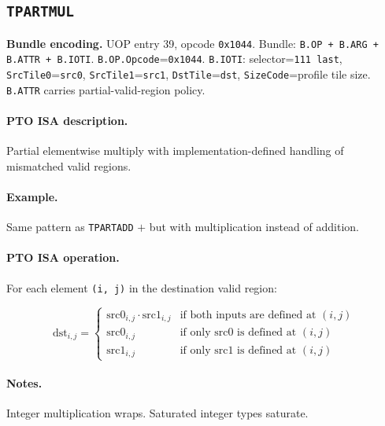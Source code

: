 \subsection{\texttt{TPARTMUL}}
\noindent\textbf{Bundle encoding.} UOP entry 39, opcode \texttt{0x1044}. Bundle: \texttt{B.OP + B.ARG + B.ATTR + B.IOTI}. \texttt{B.OP.Opcode}=\texttt{0x1044}. \texttt{B.IOTI}: selector=\texttt{111 last}, \texttt{SrcTile0}=\texttt{src0}, \texttt{SrcTile1}=\texttt{src1}, \texttt{DstTile}=\texttt{dst}, \texttt{SizeCode}=profile tile size. \texttt{B.ATTR} carries partial-valid-region policy.\par\smallskip
{\small
\paragraph{PTO ISA description.}
Partial elementwise multiply with implementation-defined handling of mismatched valid regions.
\paragraph{Example.}
Same pattern as \texttt{TPARTADD} $+$ but with multiplication instead of addition.
\par\smallskip
\paragraph{PTO ISA operation.}
For each element \texttt{(i, j)} in the destination valid region:

\[
\mathrm{dst}_{i,j} =
\begin{cases}
\mathrm{src0}_{i,j} \cdot \mathrm{src1}_{i,j} & \text{if both inputs are defined at } (i,j) \\
\mathrm{src0}_{i,j} & \text{if only src0 is defined at } (i,j) \\
\mathrm{src1}_{i,j} & \text{if only src1 is defined at } (i,j)
\end{cases}
\]
}\par\smallskip
\paragraph{Notes.}
Integer multiplication wraps. Saturated integer types saturate.
